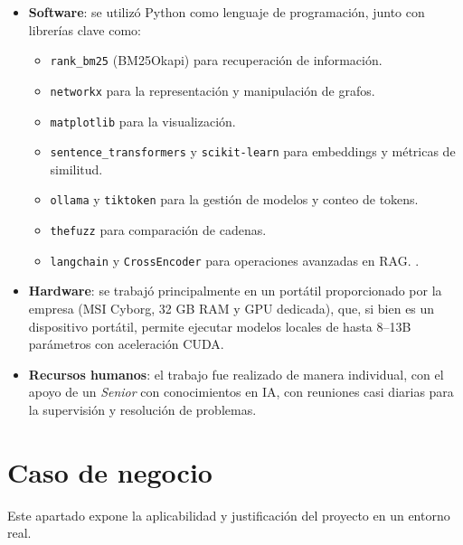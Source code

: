 \begin{itemize}
    \item \textbf{Software}: se utilizó Python como lenguaje de programación, junto con librerías clave como:
    \begin{itemize}
        \item \texttt{rank\_bm25} (BM25Okapi) para recuperación de información.  
        \item \texttt{networkx} para la representación y manipulación de grafos.  
        \item \texttt{matplotlib} para la visualización.  
        \item \texttt{sentence\_transformers} y \texttt{scikit-learn} para embeddings y métricas de similitud.  
        \item \texttt{ollama} y \texttt{tiktoken} para la gestión de modelos y conteo de tokens.  
        \item \texttt{thefuzz} para comparación de cadenas.  
        \item \texttt{langchain} y \texttt{CrossEncoder} para operaciones avanzadas en RAG.  .  
    \end{itemize}

    \item \textbf{Hardware}: se trabajó principalmente en un portátil proporcionado por la empresa (MSI Cyborg, 32 GB RAM y GPU dedicada), que, si bien es un dispositivo portátil, permite ejecutar modelos locales de hasta 8--13B parámetros con aceleración CUDA.

    \item \textbf{Recursos humanos}: el trabajo fue realizado de manera individual, con el apoyo de un \textit{Senior} con conocimientos en IA, con reuniones casi diarias para la supervisión y resolución de problemas.  
\end{itemize}

\section{Caso de negocio}
Este apartado expone la aplicabilidad y justificación del proyecto en un entorno real.  

